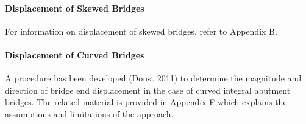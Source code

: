 \paragraph{Displacement of Skewed Bridges}
For information on displacement of skewed bridges, refer to Appendix B.

\paragraph{Displacement of Curved Bridges}

A procedure has been developed (Doust 2011) to determine the magnitude and direction of bridge end
displacement in the case of curved integral abutment bridges. The related material is provided in Appendix F which
explains the assumptions and limitations of the approach.

